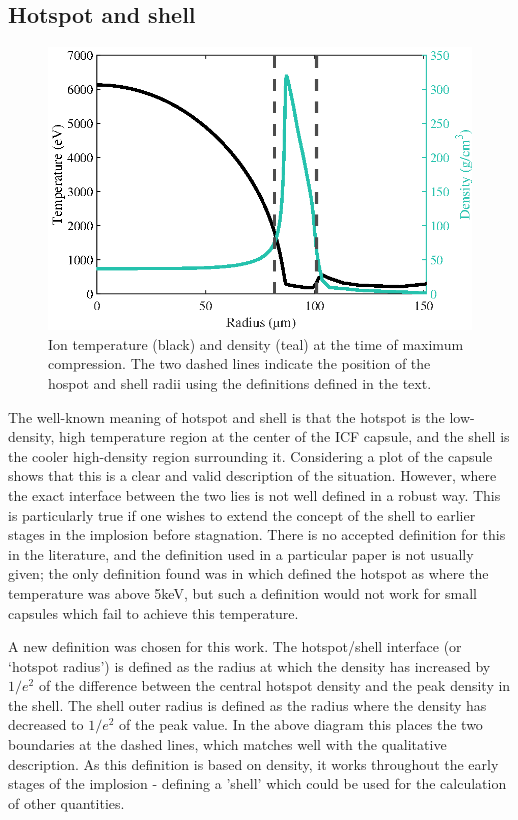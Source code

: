 \subsection{Hotspot and shell}

\begin{figure}[ht]
\centering
\includegraphics{figures/LowCR/HSDefn.eps}
\caption{Ion temperature (black) and density (teal) at the time of maximum compression. The two dashed lines indicate the position of the hospot and shell radii using the definitions defined in the text.}
\label{fig:HsDefn}
\end{figure}

The well-known meaning of hotspot and shell is that the hotspot is the low-density, high temperature region at the center of the ICF capsule, and the shell is the cooler high-density region surrounding it. Considering a plot of the capsule shows that this is a clear and valid description of the situation. However, where the exact interface between the two lies is not well defined in a robust way. This is particularly true if one wishes to extend the concept of the shell to earlier stages in the implosion before stagnation. There is no accepted definition for this in the literature, and the definition used in a particular paper is not usually given; the only definition found was in \cite{Olson2021} which defined the hotspot as where the temperature was above 5keV, but such a definition would not work for small capsules which fail to achieve this temperature.

A new definition was chosen for this work. The hotspot/shell interface (or `hotspot radius') is defined as the radius at which the density has increased by $1/e^2$ of the difference between the central hotspot density and the peak density in the shell. The shell outer radius is defined as the radius where the density has decreased to $1/e^2$ of the peak value. In the above diagram this places the two boundaries at the dashed lines, which matches well with the qualitative description. As this definition is based on density, it works throughout the early stages of the implosion - defining a 'shell' which could be used for the calculation of other quantities. 

